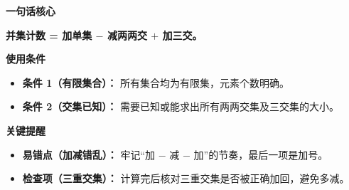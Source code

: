 \begin{summarybox}
	\textbf{\textcolor{CSummary}{一句话核心}}

	\textbf{并集计数 = 加单集 $-$ 减两两交 $+$ 加三交。}

	\medskip
	\textbf{\textcolor{CSummary}{使用条件}}
	\begin{itemize}[leftmargin=*, itemsep=0.5em, topsep=0.4em]
		\item \textbf{条件 1（有限集合）：} 所有集合均为有限集，元素个数明确。
		\item \textbf{条件 2（交集已知）：} 需要已知或能求出所有两两交集及三交集的大小。
	\end{itemize}

	\medskip
	\textbf{\textcolor{CSummary}{关键提醒}}
	\begin{itemize}[leftmargin=*, itemsep=0.5em, topsep=0.4em]
		\item \textbf{易错点（加减错乱）：} 牢记“加 $-$ 减 $-$ 加”的节奏，最后一项是加号。
		\item \textbf{检查项（三重交集）：} 计算完后核对三重交集是否被正确加回，避免多减。
	\end{itemize}
\end{summarybox}
